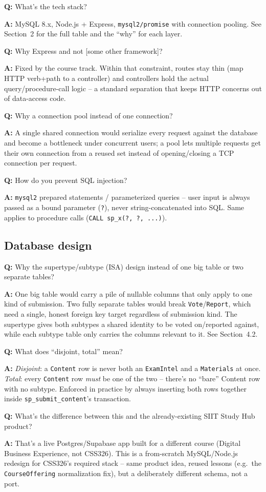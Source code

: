 \documentclass[11pt]{article}
\newcommand{\qitem}[2]{%
  \par\medskip\noindent\textbf{\color{accentc}Q:} #1\par
  \noindent\textbf{A:} #2\par
}
\begin{document}
\qitem{What's the tech stack?}{MySQL 8.x, Node.js + Express, \texttt{mysql2/promise} with connection pooling. See Section~2 for the full table and the ``why'' for each layer.}

\qitem{Why Express and not [some other framework]?}{Fixed by the course track. Within that constraint, routes stay thin (map HTTP verb+path to a controller) and controllers hold the actual query/procedure-call logic -- a standard separation that keeps HTTP concerns out of data-access code.}

\qitem{Why a connection pool instead of one connection?}{A single shared connection would serialize every request against the database and become a bottleneck under concurrent users; a pool lets multiple requests get their own connection from a reused set instead of opening/closing a TCP connection per request.}

\qitem{How do you prevent SQL injection?}{\texttt{mysql2} prepared statements / parameterized queries -- user input is always passed as a bound parameter (\texttt{?}), never string-concatenated into SQL. Same applies to procedure calls (\texttt{CALL sp\_x(?, ?, ...)}).}

\subsection{Database design}

\qitem{Why the supertype/subtype (ISA) design instead of one big table or two separate tables?}{One big table would carry a pile of nullable columns that only apply to one kind of submission. Two fully separate tables would break \texttt{Vote}/\texttt{Report}, which need a single, honest foreign key target regardless of submission kind. The supertype gives both subtypes a shared identity to be voted on/reported against, while each subtype table only carries the columns relevant to it. See Section~4.2.}

\qitem{What does ``disjoint, total'' mean?}{\emph{Disjoint}: a \texttt{Content} row is never both an \texttt{ExamIntel} and a \texttt{Materials} at once. \emph{Total}: every \texttt{Content} row \emph{must} be one of the two -- there's no ``bare'' Content row with no subtype. Enforced in practice by always inserting both rows together inside \texttt{sp\_submit\_content}'s transaction.}

\qitem{What's the difference between this and the already-existing SIIT Study Hub product?}{That's a live Postgres/Supabase app built for a different course (Digital Business Experience, not CSS326). This is a from-scratch MySQL/Node.js redesign for CSS326's required stack -- same product idea, reused lessons (e.g.\ the \texttt{CourseOffering} normalization fix), but a deliberately different schema, not a port.}
\end{document}
